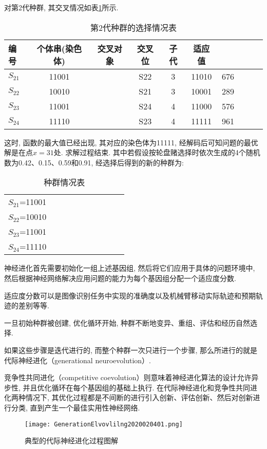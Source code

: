 对第2代种群, 其交叉情况如表\ref{AI_table2019112810}所示.
\begin{table} [H]
\caption{第2代种群的选择情况表}
\begin{center}
\begin{tabular} {lccccccccc}
  \hline
编号&	个体串(染色体)&	交叉对象&	交叉位&子代&适应值\\
  \hline
$S_{21}$&	11001&	    &S22	&3	&11010&	676\\
$S_{22}$&	10010&	    &S21    &3	&10001&	289\\
$S_{23}$&	11001&	    &S24	&4	&11000&	576\\
$S_{24}$&	11110&	   & S23	&4	&11111&	961\\
\hline
\end{tabular}
\end{center}
\label{AI_table2019112810}
\end{table}
这时, 函数的最大值已经出现, 其对应的染色体为11111, 经解码后可知问题的最优解是在点$x=31$处. 求解过程结束.
其中若假设按轮盘赌选择时依次生成的4个随机数为0.42、0.15、0.59和0.91, 经选择后得到的新的种群为:
\begin{table} [H]
\caption{种群情况表}
\begin{center}
\begin{tabular} {lccccccccc}
\hline
$S_{21}$=11001\\
$S_{22}$=10010\\
$S_{23}$=11001\\
$S_{24}$=11110\\
\hline
\end{tabular}
\end{center}
\end{table}
\begin{remark}
神经进化首先需要初始化一组上述基因组, 然后将它们应用于具体的问题环境中, 然后根据神经网络解决应用问题的能力为每个基因组分配一个适应度分数. 
\begin{newexam}
  适应度分数可以是图像识别任务中实现的准确度以及机械臂移动实际轨迹和预期轨迹的差别等等.
\end{newexam}

一旦初始种群被创建, 优化循环开始, 种群不断地变异、重组、评估和经历自然选择.

如果这些步骤是迭代进行的, 而整个种群一次只进行一个步骤, 那么所进行的就是代际神经进化（generational neuroevolution）.

竞争性共同进化（competitive coevolution）则意味着神经进化算法的设计允许异步性, 并且优化循环在每个基因组的基础上执行. 在代际神经进化和竞争性共同进化两种情况下, 其优化过程都是不间断的进行引入创新、评估创新、然后对创新进行分类, 直到产生一个最佳实用性神经网络.

\begin{figure}[H]
\centering
\texttt{[image: GenerationElvovlilng2020020401.png]}
\caption{典型的代际神经进化过程图解}
\label{GenerationElvovlilng2020020401}
\end{figure}
\end{remark}

